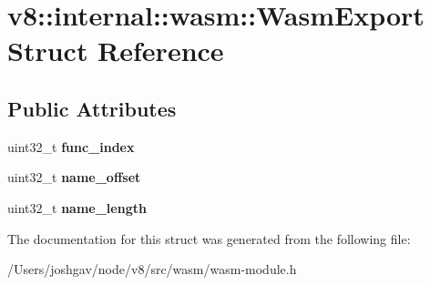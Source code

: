 \hypertarget{structv8_1_1internal_1_1wasm_1_1_wasm_export}{}\section{v8\+:\+:internal\+:\+:wasm\+:\+:Wasm\+Export Struct Reference}
\label{structv8_1_1internal_1_1wasm_1_1_wasm_export}
\subsection*{Public Attributes}
\begin{DoxyCompactItemize}
\item 
uint32\+\_\+t {\bfseries func\+\_\+index}\hypertarget{structv8_1_1internal_1_1wasm_1_1_wasm_export_afa0ba6f599a109893caaf3b436c9f44c}{}\label{structv8_1_1internal_1_1wasm_1_1_wasm_export_afa0ba6f599a109893caaf3b436c9f44c}

\item 
uint32\+\_\+t {\bfseries name\+\_\+offset}\hypertarget{structv8_1_1internal_1_1wasm_1_1_wasm_export_aa8d83872d59194dbc92b470a016943a5}{}\label{structv8_1_1internal_1_1wasm_1_1_wasm_export_aa8d83872d59194dbc92b470a016943a5}

\item 
uint32\+\_\+t {\bfseries name\+\_\+length}\hypertarget{structv8_1_1internal_1_1wasm_1_1_wasm_export_a2c27d3d7fc5d0abee80f9b4b20ef4418}{}\label{structv8_1_1internal_1_1wasm_1_1_wasm_export_a2c27d3d7fc5d0abee80f9b4b20ef4418}

\end{DoxyCompactItemize}


The documentation for this struct was generated from the following file\+:\begin{DoxyCompactItemize}
\item 
/\+Users/joshgav/node/v8/src/wasm/wasm-\/module.\+h\end{DoxyCompactItemize}
